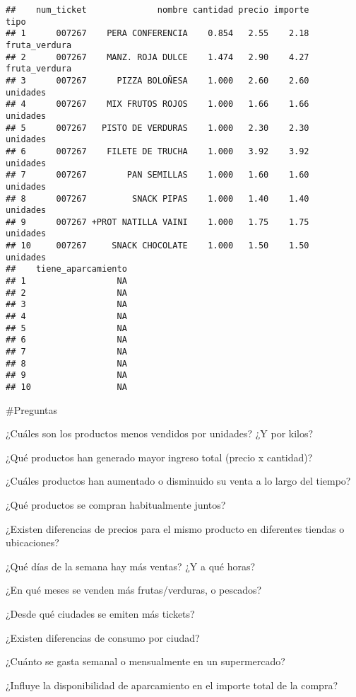 \documentclass[,,,oneauthor,pdftex]{Definitions/mdpi}
\begin{document}
\begin{verbatim}
##    num_ticket              nombre cantidad precio importe          tipo
## 1      007267    PERA CONFERENCIA    0.854   2.55    2.18 fruta_verdura
## 2      007267    MANZ. ROJA DULCE    1.474   2.90    4.27 fruta_verdura
## 3      007267      PIZZA BOLOÑESA    1.000   2.60    2.60      unidades
## 4      007267    MIX FRUTOS ROJOS    1.000   1.66    1.66      unidades
## 5      007267   PISTO DE VERDURAS    1.000   2.30    2.30      unidades
## 6      007267    FILETE DE TRUCHA    1.000   3.92    3.92      unidades
## 7      007267        PAN SEMILLAS    1.000   1.60    1.60      unidades
## 8      007267         SNACK PIPAS    1.000   1.40    1.40      unidades
## 9      007267 +PROT NATILLA VAINI    1.000   1.75    1.75      unidades
## 10     007267     SNACK CHOCOLATE    1.000   1.50    1.50      unidades
##    tiene_aparcamiento
## 1                  NA
## 2                  NA
## 3                  NA
## 4                  NA
## 5                  NA
## 6                  NA
## 7                  NA
## 8                  NA
## 9                  NA
## 10                 NA
\end{verbatim}

\#Preguntas

¿Cuáles son los productos menos vendidos por unidades? ¿Y por kilos?

¿Qué productos han generado mayor ingreso total (precio x cantidad)?

¿Cuáles productos han aumentado o disminuido su venta a lo largo del
tiempo?

¿Qué productos se compran habitualmente juntos?

¿Existen diferencias de precios para el mismo producto en diferentes
tiendas o ubicaciones?

¿Qué días de la semana hay más ventas? ¿Y a qué horas?

¿En qué meses se venden más frutas/verduras, o pescados?

¿Desde qué ciudades se emiten más tickets?

¿Existen diferencias de consumo por ciudad?

¿Cuánto se gasta semanal o mensualmente en un supermercado?

¿Influye la disponibilidad de aparcamiento en el importe total de la
compra?


\vspace{6pt}
\end{document}
